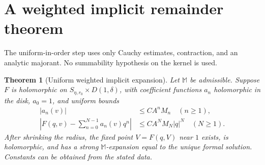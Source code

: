 \documentclass[11pt,a4paper]{article}
\numberwithin{equation}{section}
\newtheorem{theorem}{Theorem}[section]
\theoremstyle{definition}\newtheorem{definition}[theorem]{Definition}
\theoremstyle{remark}\newtheorem{remark}[theorem]{Remark}
\newcommand{\M}{\mathbb M}\newcommand{\CM}{\mathcal C_{\M}}
\begin{document}
\section{A weighted implicit remainder theorem}
\label{sec:implicit}
The uniform-in-order step uses only Cauchy estimates, contraction, and
an analytic majorant. No summability hypothesis on the kernel is used.

\begin{theorem}[Uniform weighted implicit expansion]
\label{thm:implicit}
Let $\M$ be admissible. Suppose $F$ is holomorphic on
$S_{\eta,r_0}\times D(1,\delta)$, with coefficient functions $a_n$
holomorphic in the disk, $a_0=1$, and uniform bounds
\begin{align}
 |a_n(v)|&\le CA^nM_n\quad(n\ge1),\label{eq:implicit-coeff}\\
 \left|F(q,v)-\sum_{n=0}^{N-1}a_n(v)q^n\right|
 &\le CA^NM_N|q|^N\quad(N\ge1).\label{eq:implicit-rem}
\end{align}
After shrinking the radius, the fixed point $V=F(q,V)$ near $1$ exists,
is holomorphic, and has a strong $\M$-expansion equal to the unique
formal solution. Constants can be obtained from the stated data.
\end{theorem}
\end{document}
